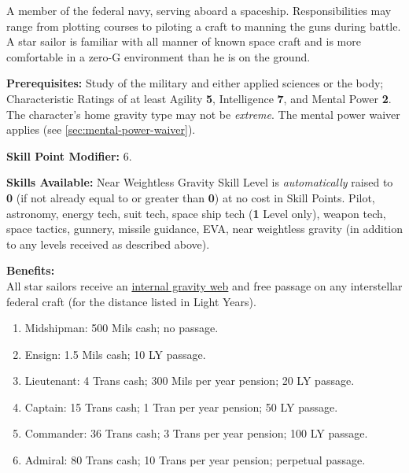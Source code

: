 \bigskip

\pagebreak[2]

\label{sec:prof-star-sailor}

A member of the federal navy, serving aboard a spaceship.
Responsibilities may range from plotting courses to piloting a craft
to manning the guns during battle. A star sailor is familiar with all
manner of known space craft and is more comfortable in a zero-G
environment than he is on the ground.

\textbf{Prerequisites:} Study of the military and either applied
sciences or the body; Characteristic Ratings of at least Agility
\textbf{5}, Intelligence \textbf{7}, and Mental Power \textbf{2}. The
character's home gravity type may not be \emph{extreme}. The mental
power waiver applies (see \ref{sec:mental-power-waiver}).

\textbf{Skill Point Modifier:} 6.

\textbf{Skills Available:} Near Weightless Gravity Skill Level is
\emph{automatically} raised to \textbf{0} (if not already equal to or
greater than \textbf{0}) at no cost in Skill Points. Pilot, astronomy,
energy tech, suit tech, space ship tech (\textbf{1} Level only),
weapon tech, space tactics, gunnery, missile guidance, EVA, near
weightless gravity (in addition to any levels received as described
above).

\pagebreak[2]
\textbf{Benefits:}\\
All star sailors receive an \hyperlink{tag:gravity-web}{internal gravity web}
and free passage on any interstellar federal craft (for the distance
listed in Light Years).
\begin{enumerate}
\item Midshipman: 500 Mils cash; no passage.  
\item Ensign: 1.5 Mils cash; 10 LY passage.  
\item Lieutenant: 4 Trans cash; 300 Mils per year pension; 20  LY passage.  
\item Captain: 15 Trans cash; 1 Tran per  year pension; 50 LY passage.  
\item Commander: 36 Trans cash; 3 Trans per year pension; 100 LY passage.   
\item Admiral: 80 Trans cash; 10 Trans per year pension;  perpetual passage.  
\end{enumerate}

\bigskip

\pagebreak[2]

